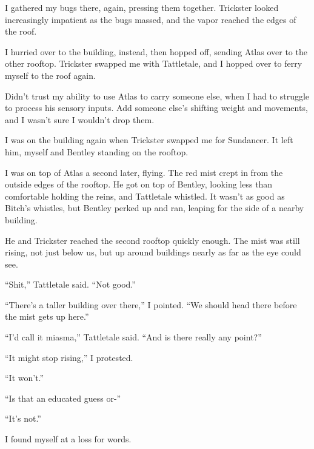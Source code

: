 I gathered my bugs there, again, pressing them together.  Trickster looked increasingly impatient as the bugs massed, and the vapor reached the edges of the roof.



I hurried over to the building, instead, then hopped off, sending Atlas over to the other rooftop.  Trickster swapped me with Tattletale, and I hopped over to ferry myself to the roof again.



Didn't trust my ability to use Atlas to carry someone else, when I had to struggle to process his sensory inputs.  Add someone else's shifting weight and movements, and I wasn't sure I wouldn't drop them.



I was on the building again when Trickster swapped me for Sundancer.  It left him, myself and Bentley standing on the rooftop.



I was on top of Atlas a second later, flying.  The red mist crept in from the outside edges of the rooftop.  He got on top of Bentley, looking less than comfortable holding the reins, and Tattletale whistled.  It wasn't as good as Bitch's whistles, but Bentley perked up and ran, leaping for the side of a nearby building.



He and Trickster reached the second rooftop quickly enough.  The mist was still rising, not just below us, but up around buildings nearly as far as the eye could see.



``Shit,''  Tattletale said.  ``Not good.''



``There's a taller building over there,'' I pointed.  ``We should head there before the mist gets up here.''



``I'd call it miasma,'' Tattletale said.  ``And is there really any point?''



``It might stop rising,'' I protested.



``It won't.''



``Is that an educated guess or-''



``It's not.''



I found myself at a loss for words.



